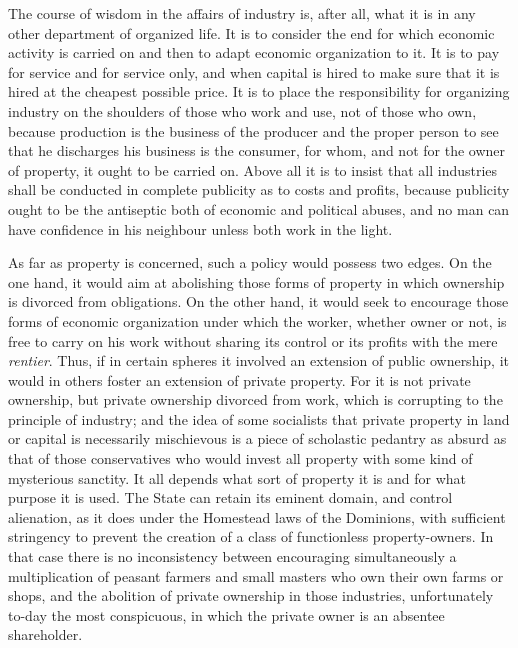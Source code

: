 \documentclass{book}
\begin{document}
The course of wisdom in the affairs of industry is, after all, what it is in any other department of organized life. It is to consider the end for which economic activity is carried on and then to adapt economic organization to it. It is to pay for service and for service only, and when capital is hired to make sure that it is hired at the cheapest possible price. It is to place the responsibility for organizing industry on the shoulders of those who work and use, not of those who own, because production is the business of the producer and the proper person to see that he discharges his business is the consumer, for whom, and not for the owner of property, it ought to be carried on. Above all it is to insist that all industries shall be conducted in complete publicity as to costs and profits, because publicity ought to be the antiseptic both of economic and political abuses, and no man can have confidence in his neighbour unless both work in the light.

As far as property is concerned, such a policy would possess two edges. On the one hand, it would aim at abolishing those forms of property in which ownership is divorced from obligations. On the other hand, it would seek to encourage those forms of economic organization under which the worker, whether owner or not, is free to carry on his work without sharing its control or its profits with the mere \emph{rentier}. Thus, if in certain spheres it involved an extension of public ownership, it would in others foster an extension of private property. For it is not private ownership, but private ownership divorced from work, which is corrupting to the principle of industry; and the idea of some socialists that private property in land or capital is necessarily mischievous is a piece of scholastic pedantry as absurd as that of those conservatives who would invest all property with some kind of mysterious sanctity. It all depends what sort of property it is and for what purpose it is used. The State can retain its eminent domain, and control alienation, as it does under the Homestead laws of the Dominions, with sufficient stringency to prevent the creation of a class of functionless property-owners. In that case there is no inconsistency between encouraging simultaneously a multiplication of peasant farmers and small masters who own their own farms or shops, and the abolition of private ownership in those industries, unfortunately to-day the most conspicuous, in which the private owner is an absentee shareholder.
\end{document}

